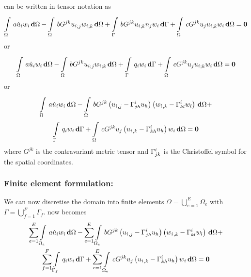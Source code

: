  can be written in tensor notation as
\begin{equation}
  \gint{\Omega}{}{a\dot{u}_{i}w_{i}}{\Omega}-
  \gint{\Omega}{}{bG^{jk}\covarderiv{u_{i}}{j}\covarderiv{w_{i}}{k}}{\Omega}+
  \gint{\Gamma}{}{bG^{jk}\covarderiv{u_{i}}{k}n_{j}w_{i}}{\Gamma} +
  \gint{\Omega}{}{cG^{jk}u_{j}\covarderiv{u_{i}}{k}w_{i}}{\Omega}=\vectr{0}
  \label{eqn:Burgerstensorform1}
\end{equation}
or
\begin{equation}
  \gint{\Omega}{}{a\dot{u}_{i}w_{i}}{\Omega}-
  \gint{\Omega}{}{bG^{jk}\covarderiv{u_{i}}{j}\covarderiv{w_{i}}{k}}{\Omega}+
  \gint{\Gamma}{}{q_{i}w_{i}}{\Gamma} +
  \gint{\Omega}{}{cG^{jk}u_{j}\covarderiv{u_{i}}{k}w_{i}}{\Omega}=\vectr{0}
  \label{eqn:Burgerstensorform2}
\end{equation}
or
\begin{multline}
  \gint{\Omega}{}{a\dot{u}_{i}w_{i}}{\Omega}-
  \gint{\Omega}{}{bG^{jk}\pbrac{\partialderiv{u_{i}}{j}-\christoffel{i}{j}{h}u_{h}}
    \pbrac{\partialderiv{w_{i}}{k}-\christoffel{i}{k}{l}w_{l}}}{\Omega}+ \\
  \gint{\Gamma}{}{q_{i}w_{i}}{\Gamma} +
  \gint{\Omega}{}{cG^{jk}u_{j}\pbrac{\partialderiv{u_{i}}{k}-
      \christoffel{i}{k}{h}u_{h}}w_{i}}{\Omega}=\vectr{0}
  \label{eqn:Burgerstensorform3}
\end{multline}
where $G^{jk}$ is the contravariant metric tensor and $ \Gamma^{i}_{jk} $
is the Christoffel symbol for the spatial coordinates.

\subsubsection{Finite element formulation:}

We can now discretise the domain into finite elements \ie $\Omega=
\displaystyle{\bigcup_{e=1}^{E}}\Omega_{e}$ with
$\Gamma=\displaystyle{\bigcup_{f=1}^{F}}\Gamma_{f}$. 
now becomes
\begin{multline}
  \dsum_{e=1}^{E}\gint{\Omega_{e}}{}{a\dot{u}_{i}w_{i}}{\Omega}-
  \dsum_{e=1}^{E}\gint{\Omega_{e}}{}{bG^{jk}\pbrac{\partialderiv{u_{i}}{j}-
      \christoffel{i}{j}{h}u_{h}} \pbrac{\partialderiv{w_{i}}{k}-
      \christoffel{i}{k}{l}w_{l}}}{\Omega}+ \\
  \dsum_{f=1}^{F}\gint{\Gamma_{f}}{}{q_{i}w_{i}}{\Gamma} +
  \dsum_{e=1}^{E}\gint{\Omega_{e}}{}{cG^{jk}u_{j}\pbrac{\partialderiv{u_{i}}{k}-
      \christoffel{i}{k}{h}u_{h}}w_{i}}{\Omega}=\vectr{0}
  \label{eqn:Burgersfemform1}
\end{multline}

